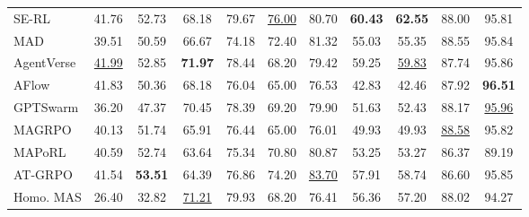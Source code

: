 \begin{table}[!htbp]
{\begin{NiceTabular}{l!{\color{black}\vrule width 0.6pt}*{10}{c}}
SE-RL & 41.76 & 52.73 & 68.18 & 79.67 & \underline{76.00} & 80.70 & \textbf{60.43} & \textbf{62.55} & 88.00 & 95.81 \\
\Xhline{0.2pt}
MAD & 39.51 & 50.59 & 66.67 & 74.18 & 72.40 & 81.32 & 55.03 & 55.35 & 88.55 & 95.84 \\
AgentVerse & \underline{41.99} & 52.85 & \textbf{71.97} & 78.44 & 68.20 & 79.42 & 59.25 & \underline{59.83} & 87.74 & 95.86 \\
AFlow & 41.83 & 50.36 & 68.18 & 76.04 & 65.00 & 76.53 & 42.83 & 42.46 & 87.92 & \textbf{96.51} \\
GPTSwarm & 36.20 & 47.37 & 70.45 & 78.39 & 69.20 & 79.90 & 51.63 & 52.43 & 88.17 & \underline{95.96} \\
\Xhline{0.2pt}
MAGRPO & 40.13 & 51.74 & 65.91 & 76.44 & 65.00 & 76.01 & 49.93 & 49.93 & \underline{88.58} & 95.82 \\
MAPoRL & 40.59 & 52.74 & 63.64 & 75.34 & 70.80 & 80.87 & 53.25 & 53.27 & 86.37 & 89.19 \\
AT-GRPO & 41.54 & \textbf{53.51} & 64.39 & 76.86 & 74.20 & \underline{83.70} & 57.91 & 58.74 & 86.60 & 95.85 \\
\Xhline{0.2pt}
Homo. MAS & 26.40 & 32.82 & \underline{71.21} & 79.93 & 68.20 & 76.41 & 56.36 & 57.20 & 88.02 & 94.27 \\

\end{NiceTabular}}
\end{table}
